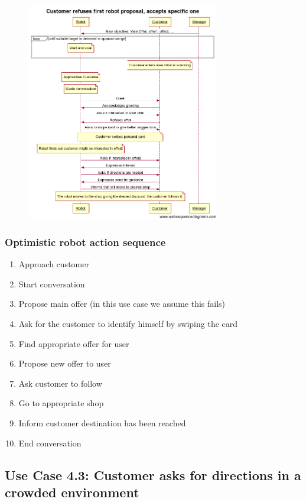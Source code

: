 \begin{figure}[!h]

\includegraphics[width=0.75\textwidth]{offerReasoning}

\end{figure}



\subsubsection{Optimistic robot action sequence}
\begin{enumerate}
\item Approach customer
\item Start conversation
\item Propose main offer (in this use case we assume this fails)
\item Ask for the customer to identify himself by swiping the card
\item Find appropriate offer for user
\item Propose new offer to user
\item Ask customer to follow
\item Go to appropriate shop
\item Inform customer destination has been reached
\item End conversation
\end{enumerate}


\subsection{Use Case 4.3: Customer asks for directions in a crowded environment}

